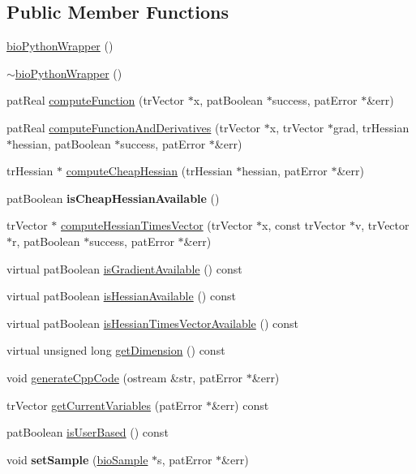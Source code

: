 \subsection*{Public Member Functions}
\begin{DoxyCompactItemize}
\item 
\hyperlink{classbio_python_wrapper_a3309c7000124b3f5438321fd1090ae8e}{bio\+Python\+Wrapper} ()
\item 
\hyperlink{classbio_python_wrapper_ace7c20e3240083deb78147e5f15a910e}{$\sim$bio\+Python\+Wrapper} ()
\item 
pat\+Real \hyperlink{classbio_python_wrapper_a69d029db3ab8c8189d2ac832093b8d61}{compute\+Function} (tr\+Vector $\ast$x, pat\+Boolean $\ast$success, pat\+Error $\ast$\&err)
\item 
pat\+Real \hyperlink{classbio_python_wrapper_a79a381fa8f8fc49f9799dec63b53f8a4}{compute\+Function\+And\+Derivatives} (tr\+Vector $\ast$x, tr\+Vector $\ast$grad, tr\+Hessian $\ast$hessian, pat\+Boolean $\ast$success, pat\+Error $\ast$\&err)
\item 
tr\+Hessian $\ast$ \hyperlink{classbio_python_wrapper_a406bb4c61e198ec7aa6f55f8d466c8d0}{compute\+Cheap\+Hessian} (tr\+Hessian $\ast$hessian, pat\+Error $\ast$\&err)
\item 
\mbox{\label{classbio_python_wrapper_a79b2077723a6bed48851c0c4e93d707a}} 
pat\+Boolean {\bfseries is\+Cheap\+Hessian\+Available} ()
\item 
tr\+Vector $\ast$ \hyperlink{classbio_python_wrapper_a2af0c18f84244ce781ca99e2afc58e48}{compute\+Hessian\+Times\+Vector} (tr\+Vector $\ast$x, const tr\+Vector $\ast$v, tr\+Vector $\ast$r, pat\+Boolean $\ast$success, pat\+Error $\ast$\&err)
\item 
virtual pat\+Boolean \hyperlink{classbio_python_wrapper_a1e8391dbed1fd49c04a042b9e15dec71}{is\+Gradient\+Available} () const
\item 
virtual pat\+Boolean \hyperlink{classbio_python_wrapper_a8dcb20aa1e057667c0feaf3174545fc8}{is\+Hessian\+Available} () const
\item 
virtual pat\+Boolean \hyperlink{classbio_python_wrapper_ad0e9def58fcc08187411ad78ef7314aa}{is\+Hessian\+Times\+Vector\+Available} () const
\item 
virtual unsigned long \hyperlink{classbio_python_wrapper_a63991abdfaca07aca3757e96cd06410d}{get\+Dimension} () const
\item 
void \hyperlink{classbio_python_wrapper_a587445d7da95e667c2332ca43ec00823}{generate\+Cpp\+Code} (ostream \&str, pat\+Error $\ast$\&err)
\item 
tr\+Vector \hyperlink{classbio_python_wrapper_ab61446fd399dcf7fbcaf667fa5834097}{get\+Current\+Variables} (pat\+Error $\ast$\&err) const
\item 
pat\+Boolean \hyperlink{classbio_python_wrapper_a8952bd430a948cdc4f42f631ca3ddbd9}{is\+User\+Based} () const
\item 
\mbox{\label{classbio_python_wrapper_a4aaa6554f09421168342484468a8ebcb}} 
void {\bfseries set\+Sample} (\hyperlink{classbio_sample}{bio\+Sample} $\ast$s, pat\+Error $\ast$\&err)
\end{DoxyCompactItemize}
